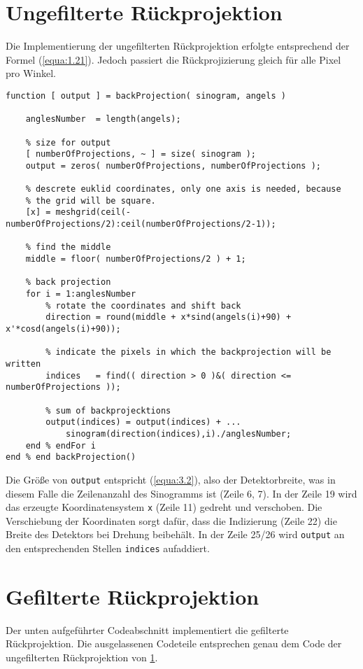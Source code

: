 \section{Ungefilterte Rückprojektion}
\label{cha:A.2}

Die Implementierung der ungefilterten Rückprojektion erfolgte entsprechend der Formel (\ref{equa:1.21}). Jedoch passiert die Rückprojizierung gleich für alle Pixel pro Winkel. 

\begin{lstlisting}[style=Matlab-editor,basicstyle=\color{black}\ttfamily\footnotesize, backgroundcolor=\color{white}]
function [ output ] = backProjection( sinogram, angels )
	
	anglesNumber  = length(angels); 
	
	% size for output
	[ numberOfProjections, ~ ] = size( sinogram );
	output = zeros( numberOfProjections, numberOfProjections );
	
	% descrete euklid coordinates, only one axis is needed, because
	% the grid will be square. 
	[x] = meshgrid(ceil(-numberOfProjections/2):ceil(numberOfProjections/2-1));
	
	% find the middle 
	middle = floor( numberOfProjections/2 ) + 1;
	
	% back projection
	for i = 1:anglesNumber
		% rotate the coordinates and shift back
		direction = round(middle + x*sind(angels(i)+90) + x'*cosd(angels(i)+90));
		
		% indicate the pixels in which the backprojection will be written
		indices   = find(( direction > 0 )&( direction <= numberOfProjections ));
		
		% sum of backprojecktions
		output(indices) = output(indices) + ...
			sinogram(direction(indices),i)./anglesNumber;
	end % endFor i
end % end backProjection() 
\end{lstlisting}
\vspace{12pt}
Die Größe von \verb|output| entspricht (\ref{equa:3.2}), also der Detektorbreite, was in diesem Falle die Zeilenanzahl des Sinogramms ist (Zeile 6, 7). In der Zeile 19 wird das erzeugte Koordinatensystem \verb|x| (Zeile 11) gedreht und verschoben. Die Verschiebung der Koordinaten sorgt dafür, dass die Indizierung (Zeile 22) die Breite des Detektors bei Drehung beibehält. In der Zeile 25/26 wird \verb|output| an den entsprechenden Stellen \verb|indices| aufaddiert.

\section{Gefilterte Rückprojektion}
\label{cha:A.3}
Der unten aufgeführter Codeabschnitt implementiert die gefilterte Rückprojektion. Die ausgelassenen Codeteile entsprechen genau dem Code der ungefilterten Rückprojektion von \ref{cha:A.2}.

